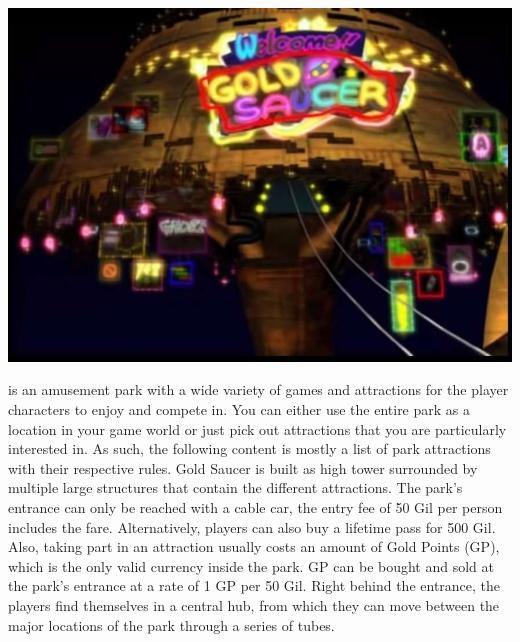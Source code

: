 %
%
%
%
%
% 
%
%
\begin{center} \includegraphics[width=\columnwidth]{./art/goldsaucer/goldsaucer.jpg} \end{center}
%
\vfill
%
 is an amusement park with a wide variety of games and attractions for the player characters to enjoy and compete in.
You can either use the entire park as a location in your game world or just pick out attractions that you are particularly interested in.
As such, the following content is mostly a list of park attractions with their respective rules.
Gold Saucer is built as high tower surrounded by multiple large structures that contain the different attractions.
The park's entrance can only be reached with a cable car, the entry fee of 50 Gil per person includes the fare.
Alternatively, players can also buy a lifetime pass for 500 Gil.
Also, taking part in an attraction usually costs an amount of Gold Points (GP), which is the only valid currency inside the park.
GP can be bought and sold at the park's entrance at a rate of 1 GP per 50 Gil.
Right behind the entrance, the players find themselves in a central hub, from which they can move between the major locations of the park through a series of tubes.
%
\vfill
%
